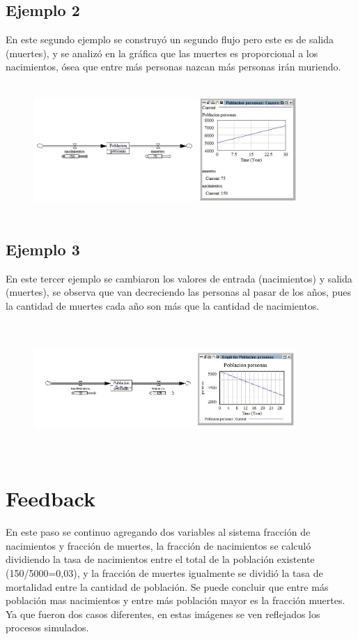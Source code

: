 \documentclass[12pt,letterpaper]{article}
\begin{document}
\subsection{	Ejemplo 2}

En este segundo ejemplo se construyó un segundo flujo pero este es de salida (muertes), y se analizó en la gráfica que las muertes es proporcional a los nacimientos, ósea que entre más personas nazcan más personas irán muriendo.

\begin{figure}
\centering
\includegraphics[width=10cm, height=5cm]{2.JPG}
\end{figure}

\subsection{Ejemplo 3}
En este tercer ejemplo se cambiaron los valores de entrada (nacimientos) y salida (muertes), se observa que van decreciendo las personas al pasar de los años, pues la cantidad de muertes cada año son más que la cantidad de nacimientos.
\begin{figure}
\centering
\includegraphics[width=10cm, height=5cm]{3.JPG}
\end{figure}

\section{Feedback}
En este paso se continuo agregando dos variables al sistema fracción de nacimientos y fracción de muertes, la fracción de nacimientos se calculó dividiendo la tasa de nacimientos entre el total de la población existente (150/5000=0,03), y la fracción de muertes igualmente se dividió la tasa de mortalidad entre la cantidad de población.
Se puede concluir que entre más población mas nacimientos y entre más población mayor es la fracción muertes.
Ya que fueron dos casos diferentes, en estas imágenes se ven reflejados los procesos simulados.
\end{document}
